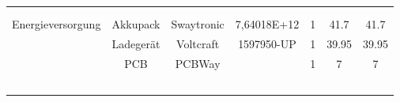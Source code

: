 \documentclass[main.tex]{subfiles} %
\begin{document}
\begin{landscape}
\begin{table}[h]
\begin{tabular}{|c|c|c|c|c|c|c|}
                            &                            &                        &                                    &                     &                            &                                 \\ \hline
                            &                            &                        &                                    &                     &                            &                                 \\ \hline
                            &                            &                        &                                    &                     &                            &                                 \\ \hline
        Energieversorgung   & Akkupack                   & Swaytronic             & 7,64018E+12                        & 1                   & 41.7                       & 41.7                            \\ \hline
                            & Ladegerät                  & Voltcraft              & 1597950-UP                         & 1                   & 39.95                      & 39.95                           \\ \hline
                            & PCB                        & PCBWay                 &                                    & 1                   & 7                          & 7                               \\ \hline
                            &                            &                        &                                    &                     &                            &                                 \\ \hline
                            &                            &                        &                                    &                     &                            &                                 \\ \hline
                            &                            &                        &                                    &                     &                            &                                 \\ \hline
                            &                            &                        &                                    &                     &                            &                                 \\ \hline
                            &                            &                        &                                    &                     &                            &                                 \\ \hline

\end{tabular}
\end{table}
\end{landscape}
\end{document}
